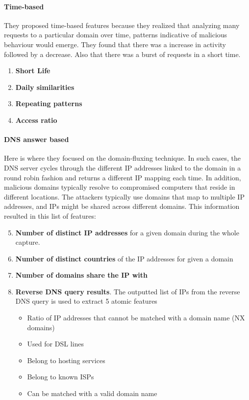 \paragraph{Time-based}
They proposed time-based features because they realized that analyzing many requests to a particular domain over time, patterns indicative of malicious behaviour would emerge. They found that there was a increase in activity followed by a decrease. Also that there was a burst of requests in a short time.
\begin{enumerate}[noitemsep]
\item \textbf{Short Life}\\
\item \textbf{Daily similarities}\\
\item \textbf{Repeating patterns}\\
\item \textbf{Access ratio}\\
\end{enumerate}
\paragraph{DNS answer based}
Here is where they focused on the domain-fluxing technique. In such cases, the DNS server cycles through the different IP addresses linked to the domain in a round robin fashion and returns a different IP mapping each time. In addition, malicious domains typically resolve to compromised computers that reside in different locations. The attackers typically use domains that map to multiple IP addresses, and IPs might be shared across different domains. This information resulted in this list of features:
\begin{enumerate}[noitemsep]
\setcounter{enumi}{4}
\item \textbf{Number of distinct IP addresses} for a given domain during the whole capture.\\
\item \textbf{Number of distinct countries} of the IP addresses for given a domain\\
\item \textbf{Number of domains share the IP with}\\
\item \textbf{Reverse DNS query results}. The outputted list of IPs from the reverse DNS query is used to extract 5 atomic features
\begin{itemize}
\item Ratio of IP addresses that cannot be matched with a domain name (NX domains)
\item Used for DSL lines
\item Belong to hosting services
\item Belong to known ISPs
\item Can be matched with a valid domain name
\end{itemize}
\end{enumerate}

